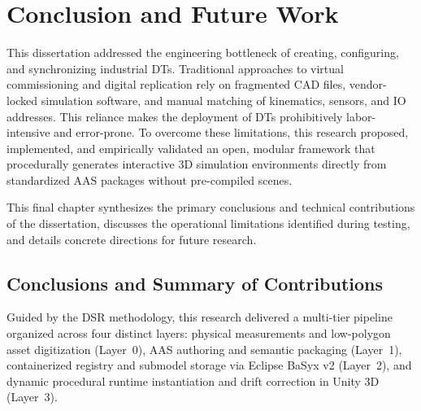 
%

\chapter{Conclusion and Future Work}
\label{cha:conclusion}

This dissertation addressed the engineering bottleneck of creating, configuring, and synchronizing industrial \glspl{DT}. Traditional approaches to virtual commissioning and digital replication rely on fragmented \gls{CAD} files, vendor-locked simulation software, and manual matching of kinematics, sensors, and \gls{IO} addresses. This reliance makes the deployment of \glspl{DT} prohibitively labor-intensive and error-prone. To overcome these limitations, this research proposed, implemented, and empirically validated an open, modular framework that procedurally generates interactive 3D simulation environments directly from standardized \gls{AAS} packages without pre-compiled scenes.

This final chapter synthesizes the primary conclusions and technical contributions of the dissertation, discusses the operational limitations identified during testing, and details concrete directions for future research.

\section{Conclusions and Summary of Contributions}
\label{sec:conclusion_summary}

Guided by the \gls{DSR} methodology, this research delivered a multi-tier pipeline organized across four distinct layers: physical measurements and low-polygon asset digitization (Layer~0), \gls{AAS} authoring and semantic packaging (Layer~1), containerized registry and submodel storage via Eclipse BaSyx v2 (Layer~2), and dynamic procedural runtime instantiation and drift correction in Unity 3D (Layer~3). 

